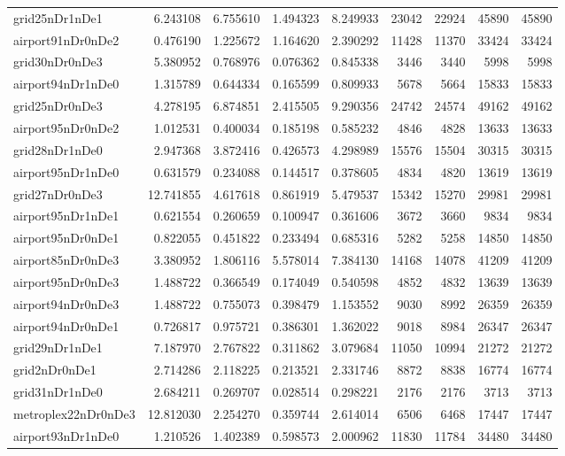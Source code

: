 \begin{longtable}{|l|r|r|r|r|r|r|r|r|}
grid25nDr1nDe1 & 6.243108 & 6.755610 & 1.494323 & 8.249933 & 23042 & 22924 & 45890 & 45890 \\
airport91nDr0nDe2 & 0.476190 & 1.225672 & 1.164620 & 2.390292 & 11428 & 11370 & 33424 & 33424 \\
grid30nDr0nDe3 & 5.380952 & 0.768976 & 0.076362 & 0.845338 & 3446 & 3440 & 5998 & 5998 \\
airport94nDr1nDe0 & 1.315789 & 0.644334 & 0.165599 & 0.809933 & 5678 & 5664 & 15833 & 15833 \\
grid25nDr0nDe3 & 4.278195 & 6.874851 & 2.415505 & 9.290356 & 24742 & 24574 & 49162 & 49162 \\
airport95nDr0nDe2 & 1.012531 & 0.400034 & 0.185198 & 0.585232 & 4846 & 4828 & 13633 & 13633 \\
grid28nDr1nDe0 & 2.947368 & 3.872416 & 0.426573 & 4.298989 & 15576 & 15504 & 30315 & 30315 \\
airport95nDr1nDe0 & 0.631579 & 0.234088 & 0.144517 & 0.378605 & 4834 & 4820 & 13619 & 13619 \\
grid27nDr0nDe3 & 12.741855 & 4.617618 & 0.861919 & 5.479537 & 15342 & 15270 & 29981 & 29981 \\
airport95nDr1nDe1 & 0.621554 & 0.260659 & 0.100947 & 0.361606 & 3672 & 3660 & 9834 & 9834 \\
airport95nDr0nDe1 & 0.822055 & 0.451822 & 0.233494 & 0.685316 & 5282 & 5258 & 14850 & 14850 \\
airport85nDr0nDe3 & 3.380952 & 1.806116 & 5.578014 & 7.384130 & 14168 & 14078 & 41209 & 41209 \\
airport95nDr0nDe3 & 1.488722 & 0.366549 & 0.174049 & 0.540598 & 4852 & 4832 & 13639 & 13639 \\
airport94nDr0nDe3 & 1.488722 & 0.755073 & 0.398479 & 1.153552 & 9030 & 8992 & 26359 & 26359 \\
airport94nDr0nDe1 & 0.726817 & 0.975721 & 0.386301 & 1.362022 & 9018 & 8984 & 26347 & 26347 \\
grid29nDr1nDe1 & 7.187970 & 2.767822 & 0.311862 & 3.079684 & 11050 & 10994 & 21272 & 21272 \\
grid2nDr0nDe1 & 2.714286 & 2.118225 & 0.213521 & 2.331746 & 8872 & 8838 & 16774 & 16774 \\
grid31nDr1nDe0 & 2.684211 & 0.269707 & 0.028514 & 0.298221 & 2176 & 2176 & 3713 & 3713 \\
metroplex22nDr0nDe3 & 12.812030 & 2.254270 & 0.359744 & 2.614014 & 6506 & 6468 & 17447 & 17447 \\
airport93nDr1nDe0 & 1.210526 & 1.402389 & 0.598573 & 2.000962 & 11830 & 11784 & 34480 & 34480 \\

\end{longtable}
